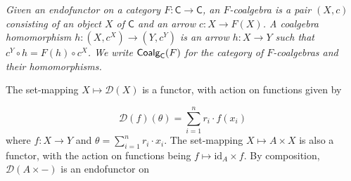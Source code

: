 \hypertarget{html:S2.Thmtheorem4.p1}{} \emph{Given an endofunctor on a category %
\hypertarget{html:S2.Thmtheorem4.p1.m1}{}\({F\colon\mathsf{C}\to\mathsf{C}}\), an \emph{%
\hypertarget{html:S2.Thmtheorem4.p1.m2}{}\({F}\)-coalgebra} is a pair %
\hypertarget{html:S2.Thmtheorem4.p1.m3}{}\({(X,c)}\) consisting of an object %
\hypertarget{html:S2.Thmtheorem4.p1.m4}{}\({X}\) of %
\hypertarget{html:S2.Thmtheorem4.p1.m5}{}\({\mathsf{C}}\) and an arrow %
\hypertarget{html:S2.Thmtheorem4.p1.m6}{}\({c\colon X\to F(X)}\). A \emph{coalgebra homomorphism} %
\hypertarget{html:S2.Thmtheorem4.p1.m7}{}\({h\colon(X,c^{X})\to(Y,c^{Y})}\) is an arrow %
\hypertarget{html:S2.Thmtheorem4.p1.m8}{}\({h\colon X\to Y}\) such that %
\hypertarget{html:S2.Thmtheorem4.p1.m9}{}\({c^{Y}\circ h=F(h)\circ c^{X}}\). We write %
\hypertarget{html:S2.Thmtheorem4.p1.m10}{}\({\mbox{\sf Coalg}_{\mathsf{C}}(F)}\) for the category of %
\hypertarget{html:S2.Thmtheorem4.p1.m11}{}\({F}\)-coalgebras and their homomorphisms.}
\par\medskip
\hypertarget{html:S2.SS0.SSS0.P0.SPx3.p2}{} The set-mapping %
\hypertarget{html:S2.SS0.SSS0.P0.SPx3.p2.m1}{}\({X\mapsto{\mathcal{D}}(X)}\) is a functor, with action on functions given by
\par\medskip
\hypertarget{html:S2.Ex3}{}   %
\hypertarget{html:S2.Ex3.m1}{}\[{\mathcal{D}}(f)(\theta)=\sum_{i=1}^{n}r_{i}\cdot f(x_{i})\]    where %
\hypertarget{html:S2.SS0.SSS0.P0.SPx3.p2.m2}{}\({f\colon X\to Y}\) and %
\hypertarget{html:S2.SS0.SSS0.P0.SPx3.p2.m3}{}\({\theta=\sum_{i=1}^{n}r_{i}\cdot x_{i}}\). The set-mapping %
\hypertarget{html:S2.SS0.SSS0.P0.SPx3.p2.m4}{}\({X\mapsto A\times X}\) is also a functor, with the action on functions being %
\hypertarget{html:S2.SS0.SSS0.P0.SPx3.p2.m5}{}\({f\mapsto\mathrm{id}_{A}\times f}\). By composition, %
\hypertarget{html:S2.SS0.SSS0.P0.SPx3.p2.m6}{}\({{\mathcal{D}}(A\times-)}\) is an endofunctor on %
